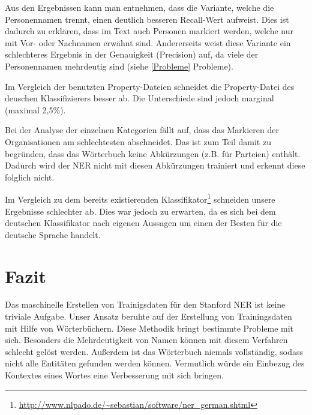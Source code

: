 \documentclass[a4paper]{article}
\begin{document}
	Aus den Ergebnissen kann man entnehmen, dass die Variante, welche die Personennamen trennt, einen deutlich besseren Recall-Wert aufweist.
	Dies ist dadurch zu erklären, dass im Text auch Personen markiert werden, welche nur mit Vor- oder Nachnamen erwähnt sind.
	Andererseits weist diese Variante ein schlechteres Ergebnis in der Genauigkeit (Precision) auf, da viele der Personennamen mehrdeutig sind (siehe \ref{Probleme} Probleme).

	Im Vergleich der benutzten Property-Dateien schneidet die Property-Datei des deuschen Klassifizierers besser ab.
	Die Unterschiede sind jedoch marginal (maximal 2,5\%).

	Bei der Analyse der einzelnen Kategorien fällt auf, dass das Markieren der Organisationen am schlechtesten abschneidet.
	Das ist zum Teil damit zu begründen, dass das Wörterbuch keine Abkürzungen (z.B. für Parteien) enthält.
	Dadurch wird der NER nicht mit diesen Abkürzungen trainiert und erkennt diese folglich nicht.

	Im Vergleich zu dem bereits existierenden Klassifikator\footnote{\url{http://www.nlpado.de/~sebastian/software/ner_german.shtml}} schneiden unsere Ergebnisse schlechter ab.
	Dies war jedoch zu erwarten, da es sich bei dem deutschen Klassifikator nach eigenen Aussagen um einen der Besten für die deutsche Sprache handelt.

\section{Fazit}
	Das maschinelle Erstellen von Trainigsdaten für den Stanford NER ist keine triviale Aufgabe.
	Unser Ansatz beruhte auf der Erstellung von Trainingsdaten mit Hilfe von Wörterbüchern.
	Diese Methodik bringt bestimmte Probleme mit sich.
	Besonders die Mehrdeutigkeit von Namen können mit diesem Verfahren schlecht gelöst werden.
	Außerdem ist das Wörterbuch niemals vollständig, sodass nicht alle Entitäten gefunden werden können.
	Vermutlich würde ein Einbezug des Kontextes eines Wortes eine Verbesserung mit sich bringen.
\end{document}
